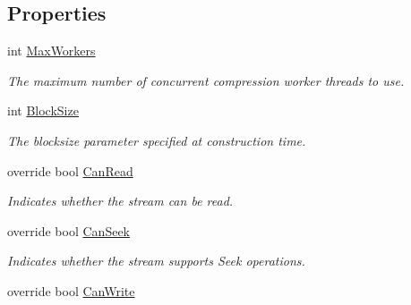 \subsection*{Properties}
\begin{DoxyCompactItemize}
\item 
int \mbox{\hyperlink{class_super_tiled2_unity_1_1_ionic_1_1_b_zip2_1_1_parallel_b_zip2_output_stream_a489040cd5f0d61998d1d64ed539cdfd2}{Max\+Workers}}
\begin{DoxyCompactList}\small\item\em The maximum number of concurrent compression worker threads to use. \end{DoxyCompactList}\item 
int \mbox{\hyperlink{class_super_tiled2_unity_1_1_ionic_1_1_b_zip2_1_1_parallel_b_zip2_output_stream_ad5587967d735034948f62bce57095077}{Block\+Size}}
\begin{DoxyCompactList}\small\item\em The blocksize parameter specified at construction time. \end{DoxyCompactList}\item 
override bool \mbox{\hyperlink{class_super_tiled2_unity_1_1_ionic_1_1_b_zip2_1_1_parallel_b_zip2_output_stream_a556832e6dfaebf55d7a3ef7612c6fe67}{Can\+Read}}
\begin{DoxyCompactList}\small\item\em Indicates whether the stream can be read. \end{DoxyCompactList}\item 
override bool \mbox{\hyperlink{class_super_tiled2_unity_1_1_ionic_1_1_b_zip2_1_1_parallel_b_zip2_output_stream_aa3e62590e42363ec9879adf9ce381ae7}{Can\+Seek}}
\begin{DoxyCompactList}\small\item\em Indicates whether the stream supports Seek operations. \end{DoxyCompactList}\item 
override bool \mbox{\hyperlink{class_super_tiled2_unity_1_1_ionic_1_1_b_zip2_1_1_parallel_b_zip2_output_stream_a6a06444702f9574f7d62ca17df11c587}{Can\+Write}}

\end{DoxyCompactItemize}
